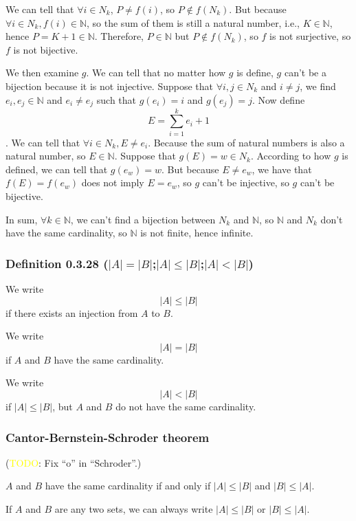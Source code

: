\documentclass[12pt, letterpaper, oneside]{book}
\begin{document}
We can tell that $\forall i \in N_k$, $P \neq f(i)$, so $P \notin f(N_k)$. But
because $\forall i \in N_k, f(i) \in \mathbb{N}$, so the sum of them is still
a natural number, i.e., $K \in \mathbb{N}$, hence $P = K + 1 \in \mathbb{N}$.
Therefore, $P \in \mathbb{N}$ but $P \notin f(N_k)$, so $f$ is not surjective,
so $f$ is not bijective.

We then examine $g$. We can tell that no matter how $g$ is define, $g$ can't be
a bijection because it is not injective. Suppose that $\forall i, j \in N_k$
and $i \neq j$, we find $e_i, e_j \in \mathbb{N}$ and $e_i \neq e_j$ such that
$g(e_i) = i$ and $g(e_j) = j$. Now define \[E = \sum_{i=1}^{k} e_i + 1\]. We
can tell that $\forall i \in N_k, E \neq e_i$. Because the sum of natural
numbers is also a natural number, so $E \in \mathbb{N}$. Suppose that $g(E) = w
  \in N_k$. According to how $g$ is defined, we can tell that $g(e_w) = w$. But
because $E \neq e_w$, we have that $f(E) = f(e_w)$ does not imply $E = e_w$, so
$g$ can't be injective, so $g$ can't be bijective.

In sum, $\forall k \in \mathbb{N}$, we can't find a bijection between $N_k$ and
$\mathbb{N}$, so $\mathbb{N}$ and $N_k$ don't have the same cardinality, so
$\mathbb{N}$ is not finite, hence infinite.

\subsubsection{Definition 0.3.28 ($|A|=|B|$;$|A| \leq |B|$;$|A|<|B|$)}

We write \[|A| \leq |B|\] if there exists an injection from $A$ to $B$.

We write \[|A| = |B|\] if $A$ and $B$ have the same cardinality.

We write \[|A| < |B|\] if $|A| \leq |B|$, but $A$ and $B$ do not have the same
cardinality.

\subsubsection{Cantor-Bernstein-Schroder theorem}

(\colorbox{red!100}{\textcolor{yellow}{TODO}}: Fix ``o'' in ``Schroder''.)

$A$ and $B$ have the same cardinality if and only if $|A| \leq |B|$ and $|B|
  \leq |A|$.

If $A$ and $B$ are any two sets, we can always write $|A| \leq |B|$ or $|B|
  \leq |A|$.
\end{document}
